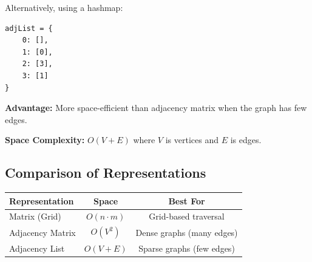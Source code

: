 \documentclass{article}
\begin{document}
Alternatively, using a hashmap:
\begin{verbatim}
adjList = {
    0: [],
    1: [0],
    2: [3],
    3: [1]
}
\end{verbatim}

\textbf{Advantage:} More space-efficient than adjacency matrix when the graph has few edges.

\textbf{Space Complexity:} $O(V + E)$ where $V$ is vertices and $E$ is edges.

\subsection{Comparison of Representations}

\begin{center}
\begin{tabular}{l c c}
\toprule
\textbf{Representation} & \textbf{Space} & \textbf{Best For} \\
\midrule
Matrix (Grid) & $O(n \cdot m)$ & Grid-based traversal \\
Adjacency Matrix & $O(V^2)$ & Dense graphs (many edges) \\
Adjacency List & $O(V + E)$ & Sparse graphs (few edges) \\
\bottomrule
\end{tabular}
\end{center}
\end{document}

